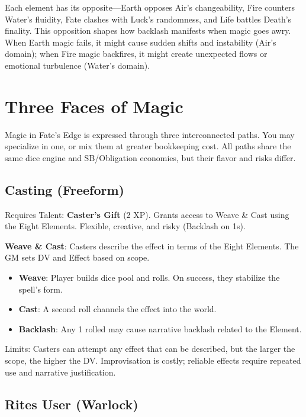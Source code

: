 Each element has its opposite—Earth opposes Air's changeability, Fire counters Water's fluidity, Fate clashes with Luck's randomness, and Life battles Death's finality. This opposition shapes how backlash manifests when magic goes awry. When Earth magic fails, it might cause sudden shifts and instability (Air's domain); when Fire magic backfires, it might create unexpected flows or emotional turbulence (Water's domain).

\section*{Three Faces of Magic}

Magic in Fate's Edge is expressed through three interconnected paths. You may specialize in one, or mix them at greater bookkeeping cost. All paths share the same dice engine and SB/Obligation economies, but their flavor and risks differ.

\subsection*{Casting (Freeform)}

Requires Talent: \textbf{Caster's Gift} (2 XP). Grants access to Weave & Cast using the Eight Elements. Flexible, creative, and risky (Backlash on 1s).

\textbf{Weave \& Cast}: Casters describe the effect in terms of the Eight Elements. The GM sets DV and Effect based on scope.
\begin{itemize}
    \item \textbf{Weave}: Player builds dice pool and rolls. On success, they stabilize the spell's form.
    \item \textbf{Cast}: A second roll channels the effect into the world.
    \item \textbf{Backlash}: Any 1 rolled may cause narrative backlash related to the Element.
\end{itemize}

Limits: Casters can attempt any effect that can be described, but the larger the scope, the higher the DV. Improvisation is costly; reliable effects require repeated use and narrative justification.

\subsection*{Rites User (Warlock)}

